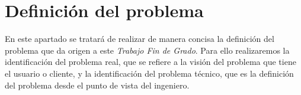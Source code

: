 \chapter{Definición del problema}
\label{cha:DefinicionDelProblema}



En este apartado se tratará de realizar de manera concisa la definición del problema que da origen a este \textit{Trabajo Fin de Grado}. Para ello realizaremos la identificación del problema real, que se refiere a la visión del problema que tiene el usuario o cliente, y la identificación del problema técnico, que es la definición del problema desde el punto de vista del ingeniero.


